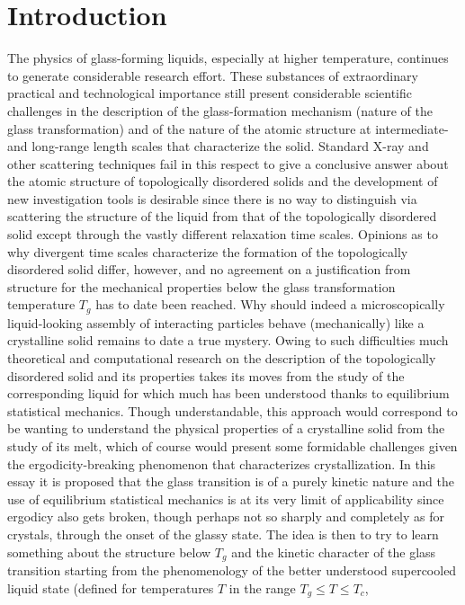 \documentclass[10pt]{article}
\begin{document}
\section{Introduction}
The physics of glass-forming liquids, especially at higher temperature, continues 
to generate considerable research effort. These substances of extraordinary practical
and technological importance still present considerable scientific challenges in the
description of the glass-formation mechanism (nature of the glass transformation)
and of the nature of the atomic structure at intermediate- and long-range length
scales that characterize the solid. Standard X-ray and other scattering techniques fail 
in this respect to give a conclusive answer about the atomic structure of topologically 
disordered solids and the development of new investigation tools is desirable since 
there is no way to distinguish via scattering the structure of the liquid from that of 
the topologically disordered solid except through the vastly different relaxation time 
scales. Opinions as to why divergent time scales characterize the formation of the 
topologically disordered solid differ, however, and no agreement on a justification from 
structure for the mechanical properties below the glass transformation temperature 
$T_g$ has to date been reached. Why should indeed a microscopically liquid-looking 
assembly of interacting particles behave (mechanically) like a crystalline solid remains 
to date a true mystery. Owing to such difficulties much theoretical and computational 
research on the description of the topologically disordered solid 
and its properties takes its moves from the study of the corresponding liquid for which 
much has been understood thanks to equilibrium statistical mechanics. Though 
understandable, this approach would correspond to be wanting to understand the 
physical properties of a crystalline solid from the study of its melt, which of course 
would present some formidable challenges given the ergodicity-breaking phenomenon 
that characterizes crystallization. In this essay it is proposed that the glass transition is 
of a purely kinetic nature and the use of equilibrium statistical mechanics is at its very 
limit of applicability since ergodicy also gets broken, though perhaps not so sharply 
and completely as for crystals, through the onset of the glassy state. The idea is then 
to try to learn something about the structure below $T_g$ and the kinetic character of 
the glass transition starting from the phenomenology of the better understood 
supercooled liquid state (defined for temperatures $T$ in the range $T_g\le T\le T_c$, 
\end{document}
